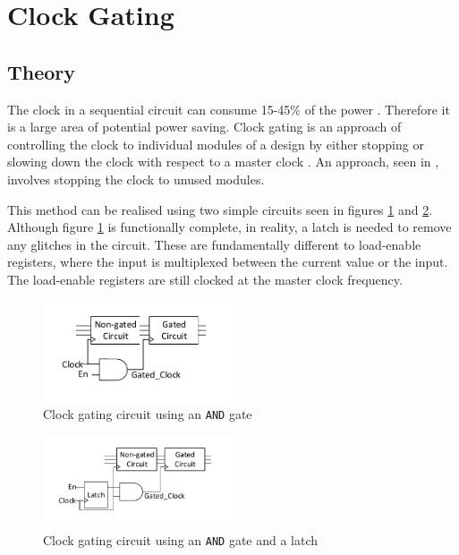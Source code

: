 
\section{Clock Gating}

\subsection{Theory}

The clock in a sequential circuit can consume 15-45\% of the power \cite{pedram1996power}.
Therefore it is a large area of potential power saving.
Clock gating is an approach of controlling the clock to individual modules of a design by either stopping or slowing down the clock with respect to a master clock \cite{841927}. 
An approach, seen in \cite{tellez1995activity}, involves stopping the clock to unused modules.

This method can be realised using two simple circuits seen in figures \ref{fig:cg:circuit1} and \ref{fig:cg:circuit2}.
Although figure \ref{fig:cg:circuit1} is functionally complete, in reality, a latch is needed to remove any glitches in the circuit.
These are fundamentally different to load-enable registers, where the input is multiplexed between the current value or the input.
The load-enable registers are still clocked at the master clock frequency.

\begin{figure}[t]
\centering
\includegraphics[width=0.5\textwidth]{Figures/clockgating_and.pdf}
\caption{Clock gating circuit using an \texttt{AND} gate}
\label{fig:cg:circuit1}
\end{figure}

\begin{figure}[b]
\includegraphics[width=0.5\textwidth]{Figures/clockgating_latch.pdf}
\caption{Clock gating circuit using an \texttt{AND} gate and a latch}
\label{fig:cg:circuit2}
\end{figure}

